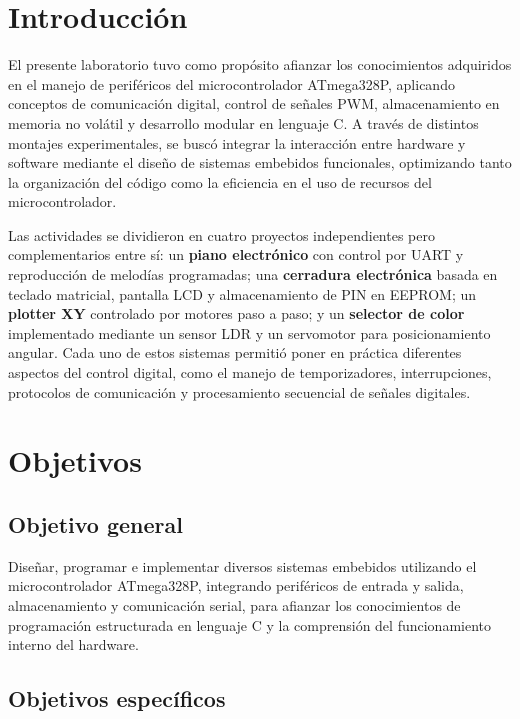 \section{Introducción}

El presente laboratorio tuvo como propósito afianzar los conocimientos adquiridos en el manejo de periféricos del microcontrolador ATmega328P, 
aplicando conceptos de comunicación digital, control de señales PWM, almacenamiento en memoria no volátil y desarrollo modular en lenguaje C. 
A través de distintos montajes experimentales, se buscó integrar la interacción entre hardware y software mediante el diseño de sistemas embebidos funcionales, 
optimizando tanto la organización del código como la eficiencia en el uso de recursos del microcontrolador.

Las actividades se dividieron en cuatro proyectos independientes pero complementarios entre sí: 
un \textbf{piano electrónico} con control por UART y reproducción de melodías programadas; 
una \textbf{cerradura electrónica} basada en teclado matricial, pantalla LCD y almacenamiento de PIN en EEPROM; 
un \textbf{plotter XY} controlado por motores paso a paso; 
y un \textbf{selector de color} implementado mediante un sensor LDR y un servomotor para posicionamiento angular.  
Cada uno de estos sistemas permitió poner en práctica diferentes aspectos del control digital, 
como el manejo de temporizadores, interrupciones, protocolos de comunicación y procesamiento secuencial de señales digitales.

\section{Objetivos}

\subsection{Objetivo general}

Diseñar, programar e implementar diversos sistemas embebidos utilizando el microcontrolador ATmega328P, 
integrando periféricos de entrada y salida, almacenamiento y comunicación serial, 
para afianzar los conocimientos de programación estructurada en lenguaje C y la comprensión del funcionamiento interno del hardware.

\subsection{Objetivos específicos}


